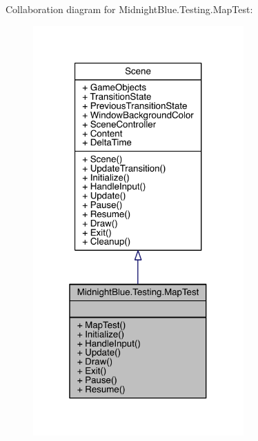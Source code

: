 Collaboration diagram for Midnight\+Blue.\+Testing.\+Map\+Test\+:
\nopagebreak
\begin{figure}[H]
\begin{center}
\leavevmode
\includegraphics[width=229pt]{class_midnight_blue_1_1_testing_1_1_map_test__coll__graph}
\end{center}
\end{figure}
